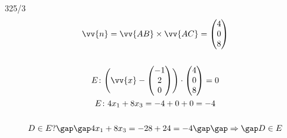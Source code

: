 \begin{exercise}{325/3}
\begin{gather*}
    \vv{n} = \vv{AB} \times \vv{AC} = \begin{pmatrix}4 \\ 0 \\ 8\end{pmatrix} \\\\
    E \colon \Biggl(\vv{x} - \begin{pmatrix}-1 \\ 2 \\ 0\end{pmatrix}\Biggr) \cdot \begin{pmatrix}4 \\ 0 \\ 8\end{pmatrix} = 0 \\
    E \colon 4x_1 + 8x_3 = -4 + 0 + 0 = -4 \\\\
    D \in E? \gap\gap 4x_1 + 8x_3 = -28 + 24 = -4 \gap\gap \Rightarrow\gap D \in E
  \end{gather*}
\end{exercise}
